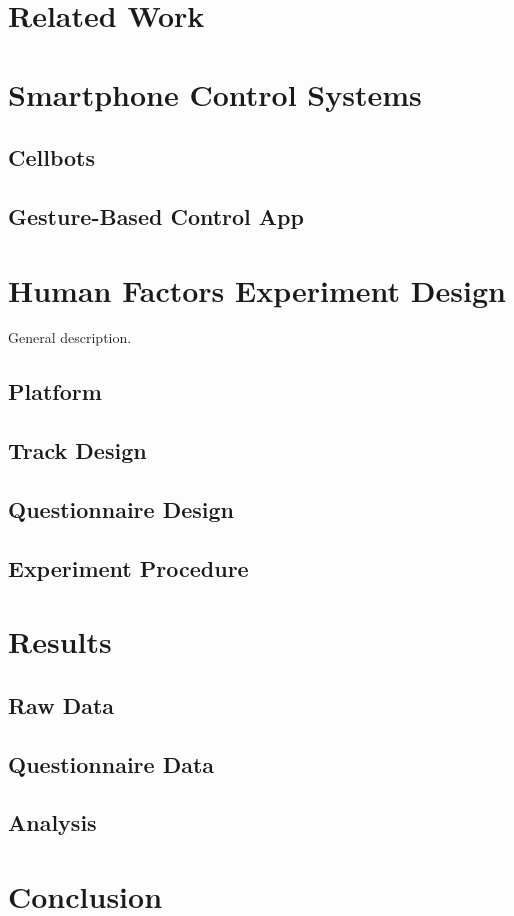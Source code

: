 \documentclass[12pt,a4paper]{report}
\begin{document}
\chapter{Related Work}

\chapter{Smartphone Control Systems}
\section{Cellbots}
\section{Gesture-Based Control App}

\chapter{Human Factors Experiment Design}
General description.
\section{Platform}
\section{Track Design}
\section{Questionnaire Design}
\section{Experiment Procedure}

\chapter{Results}
\section{Raw Data}
\section{Questionnaire Data}
\section{Analysis}

\chapter{Conclusion}



\end{document}
